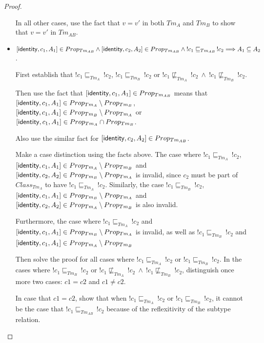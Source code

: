 \begin{proof}
\begin{itemize}
    In all other cases, use the fact that $v = v'$ in both $Tm_{A}$ and $Tm_{B}$ to show that $v = v'$ in $Tm_{AB}$.
    
    
    \item $[ \mathsf{identity}, c_1, A_1 ] \in Prop_{Tm_{AB}} \land [ \mathsf{identity}, c_2, A_2 ] \in Prop_{Tm_{AB}}\: \land\: !c_1 \sqsubseteq_{Tm_{AB}}\, !c_2 \Longrightarrow A_1 \subseteq A_2$.
    
    First establish that $!c_1 \sqsubseteq_{Tm_A}\ !c_2$, $!c_1 \sqsubseteq_{Tm_B}\ !c_2$ or $!c_1 \not\sqsubseteq_{Tm_A}\ !c_2\ \land\ !c_1 \not\sqsubseteq_{Tm_B}\ !c_2$.
    
    Then use the fact that $[ \mathsf{identity}, c_1, A_1 ] \in Prop_{Tm_{AB}}$ means that $[ \mathsf{identity}, c_1, A_1 ] \in Prop_{Tm_{A}} \setminus Prop_{Tm_{B}}$, $[ \mathsf{identity}, c_1, A_1 ] \in Prop_{Tm_{B}} \setminus Prop_{Tm_{A}}$ or $[ \mathsf{identity}, c_1, A_1 ] \in Prop_{Tm_{A}} \cap Prop_{Tm_{B}}$.
    
    Also use the similar fact for $[ \mathsf{identity}, c_2, A_2 ] \in Prop_{Tm_{AB}}$.
    
    Make a case distinction using the facts above. The case where $!c_1 \sqsubseteq_{Tm_A}\ !c_2$, $[ \mathsf{identity}, c_1, A_1 ] \in Prop_{Tm_{A}} \setminus Prop_{Tm_{B}}$ and $[ \mathsf{identity}, c_2, A_2 ] \in Prop_{Tm_{B}} \setminus Prop_{Tm_{A}}$ is invalid, since $c_2$ must be part of $Class_{Tm_A}$ to have $!c_1 \sqsubseteq_{Tm_A}\ !c_2$. Similarly, the case $!c_1 \sqsubseteq_{Tm_B}\ !c_2$, $[ \mathsf{identity}, c_1, A_1 ] \in Prop_{Tm_{B}} \setminus Prop_{Tm_{A}}$ and $[ \mathsf{identity}, c_2, A_2 ] \in Prop_{Tm_{A}} \setminus Prop_{Tm_{B}}$ is also invalid.

    Furthermore, the case where $!c_1 \sqsubseteq_{Tm_A}\ !c_2$ and $[ \mathsf{identity}, c_1, A_1 ] \in Prop_{Tm_{B}} \setminus Prop_{Tm_{A}}$ is invalid, as well as $!c_1 \sqsubseteq_{Tm_B}\ !c_2$ and $[ \mathsf{identity}, c_1, A_1 ] \in Prop_{Tm_{A}} \setminus Prop_{Tm_{B}}$
    
    Then solve the proof for all cases where $!c_1 \sqsubseteq_{Tm_A}\ !c_2$ or $!c_1 \sqsubseteq_{Tm_B}\ !c_2$. In the cases where $!c_1 \sqsubseteq_{Tm_B}\ !c_2$ or $!c_1 \not\sqsubseteq_{Tm_A}\ !c_2\ \land\ !c_1 \not\sqsubseteq_{Tm_B}\ !c_2$, distinguish once more two cases: $c1 = c2$ and $c1 \neq c2$.
    
    In case that $c1 = c2$, show that when $!c_1 \sqsubseteq_{Tm_A}\ !c_2$ or $!c_1 \sqsubseteq_{Tm_B}\ !c_2$, it cannot be the case that $!c_1 \sqsubseteq_{Tm_{AB}}\, !c_2$ because of the reflexitivity of the subtype relation.
    

\end{itemize}
\end{proof}
